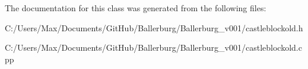 The documentation for this class was generated from the following files\+:\begin{DoxyCompactItemize}
\item 
C\+:/\+Users/\+Max/\+Documents/\+Git\+Hub/\+Ballerburg/\+Ballerburg\+\_\+v001/castleblockold.\+h\item 
C\+:/\+Users/\+Max/\+Documents/\+Git\+Hub/\+Ballerburg/\+Ballerburg\+\_\+v001/castleblockold.\+cpp\end{DoxyCompactItemize}
